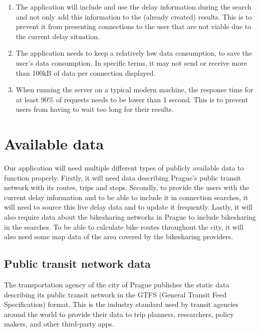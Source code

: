 \begin{enumerate}
\renewcommand{\labelenumi}{\textbf{R\arabic{enumi}}}
\setcounter{enumi}{20}
\item The application will include and use the delay information during the search and not only add this information to the (already created) results. This is to prevent it from presenting connections to the user that are not viable due to the current delay situation.
\label{req:delays_included_in_search}

\item The application needs to keep a relatively low data consumption, to save the user's data consumption. In specific terms, it may not send or receive more than 100kB of data per connection displayed.
\label{req:low_data}

\item When running the server on a typical modern machine, the response time for at least 90\% of requests needs to be lower than 1 second. This is to prevent users from having to wait too long for their results.
\label{req:response_time}
\end{enumerate}



\section{Available data}

Our application will need multiple different types of publicly available data to function properly. Firstly, it will need data describing Prague's public transit network with its routes, trips and stops. Secondly, to provide the users with the current delay information and to be able to include it in connection searches, it will need to source this live delay data and to update it frequently. Lastly, it will also require data about the bikesharing networks in Prague to include bikesharing in the searches. To be able to calculate bike routes throughout the city, it will also need some map data of the area covered by the bikesharing providers.

\subsection{Public transit network data}

The transportation agency of the city of Prague publishes the static data describing its public transit network in the GTFS (General Transit Feed Specification) format. This is the industry standard used by transit agencies around the world to provide their data to trip planners, researchers, policy makers, and other third-party apps\cite{gtfs2024}.

